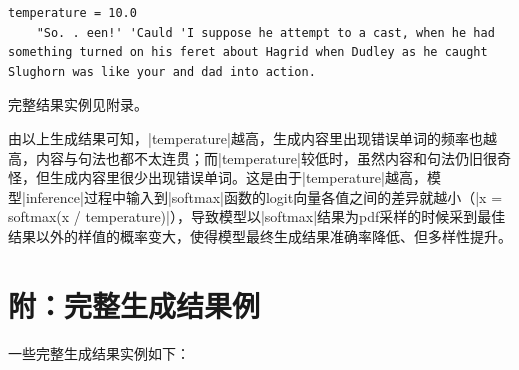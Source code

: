 \documentclass[11pt, a4paper]{article}
\begin{document}
\begin{enumerate}
\begin{lstlisting}
temperature = 10.0
    "So. . een!' 'Cauld 'I suppose he attempt to a cast, when he had something turned on his feret about Hagrid when Dudley as he caught Slughorn was like your and dad into action.
\end{lstlisting}

    完整结果实例见附录。

    由以上生成结果可知，|temperature|越高，生成内容里出现错误单词的频率也越高，内容与句法也都不太连贯；而|temperature|较低时，虽然内容和句法仍旧很奇怪，但生成内容里很少出现错误单词。这是由于|temperature|越高，模型|inference|过程中输入到|softmax|函数的logit向量各值之间的差异就越小（|x = softmax(x / temperature)|），导致模型以|softmax|结果为pdf采样的时候采到最佳结果以外的样值的概率变大，使得模型最终生成结果准确率降低、但多样性提升。

\end{enumerate}


\section*{附：完整生成结果例}
一些完整生成结果实例如下：



\end{document}
